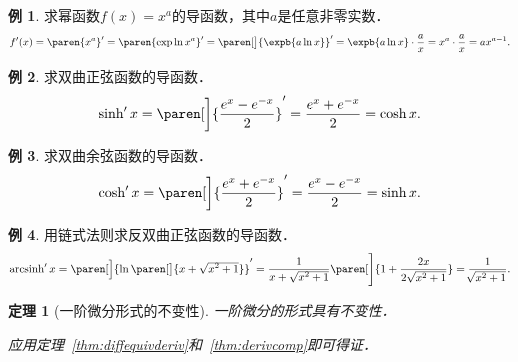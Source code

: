 \documentclass[a4paper,punct=CCT]{ctexbook}
\makeatletter
\newtheorem*{theorem*}{定理}
\theoremstyle{definition}
\newtheorem*{example*}{例}
\theoremstyle{remark}
\renewcommand*{\proofname}{证}
\renewenvironment{proof}[1][\proofname]{\par
  \pushQED{\qed}%
  \normalfont \topsep6\p@\@plus6\p@\relax
  \trivlist
  \item[\hskip\labelsep
    \bfseries
    #1%
    ]\ignorespaces
}{%
  \popQED\endtrivlist\@endpefalse
}
\makeatother
\begin{document}
\begin{example*}
  求幂函数\(f(x) = x^a\)的导函数，其中\(a\)是任意非零实数．
  \begin{equation*}
    f'(x)
    = \paren{x^a}'
    = \paren{\exp\ln x^a}'
    = \paren[\big]{\expb{a \ln x}}'
    = \expb{a \ln x} \cdot \frac{a}{x}
    = x^a \cdot \frac ax
    = ax^{a-1}.
  \end{equation*}
\end{example*}

\begin{example*}
  求双曲正弦函数的导函数．
  \begin{equation*}
    \sinh' x
    = \paren[\bigg]{\frac{e^x - e^{-x}}{2}}'
    = \frac{e^x + e^{-x}}{2}
    = \cosh x.
  \end{equation*}
\end{example*}

\begin{example*}
  求双曲余弦函数的导函数．
  \begin{equation*}
    \cosh' x
    = \paren[\bigg]{\frac{e^x+e^{-x}}{2}}'
    = \frac{e^x - e^{-x}}{2}
    = \sinh x.
  \end{equation*}
\end{example*}

\begin{example*}
  用链式法则求反双曲正弦函数的导函数．
  \begin{equation*}
    \arcsinh' x
    = \paren[\Big]{\ln\paren[\big]{x + \sqrt{\smash{x^2} + 1}}}'
    = \frac{1}{x + \sqrt{\smash{x^2} + 1}} \paren[\Bigg]{1 + \frac{2x}{2\sqrt{x^2 + 1}}}
    = \frac{1}{\negthickspace\sqrt{x^2 + 1}}.
  \end{equation*}
\end{example*}

\begin{theorem*}[一阶微分形式的不变性]
  一阶微分的形式具有不变性．

  \begin{proof}
    应用定理~\ref{thm:diffequivderiv}和~\ref{thm:derivcomp}即可得证．
  \end{proof}
\end{theorem*}
\end{document}
